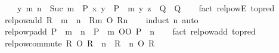 \begin{isabellebody}
\ \ \ \ {\isacharparenleft}{\kern0pt}{\isasymAnd}y\ m{\isachardot}{\kern0pt}\ n\ {\isacharequal}{\kern0pt}\ Suc\ m\ {\isasymLongrightarrow}\ P\ x\ y\ {\isasymLongrightarrow}\ {\isacharparenleft}{\kern0pt}P\ {\isacharcircum}{\kern0pt}{\isacharcircum}{\kern0pt}\ m{\isacharparenright}{\kern0pt}\ y\ z\ {\isasymLongrightarrow}\ Q{\isacharparenright}{\kern0pt}\ {\isasymLongrightarrow}\ Q{\isachardoublequoteclose}\isanewline
%
\isadelimproof
\ \ %
\endisadelimproof
%
\isatagproof
{}\isamarkupfalse%
\ {\isacharparenleft}{\kern0pt}fact\ relpow{\isacharunderscore}{\kern0pt}E{}\ {\isacharbrackleft}{\kern0pt}to{\isacharunderscore}{\kern0pt}pred{\isacharbrackright}{\kern0pt}{\isacharparenright}{\kern0pt}%
\endisatagproof
{\isafoldproof}%
%
\isadelimproof
\isanewline
%
\endisadelimproof
\isanewline
{}\isamarkupfalse%
\ relpow{\isacharunderscore}{\kern0pt}add{\isacharcolon}{\kern0pt}\ {\isachardoublequoteopen}R\ {\isacharcircum}{\kern0pt}{\isacharcircum}{\kern0pt}\ {\isacharparenleft}{\kern0pt}m\ {\isacharplus}{\kern0pt}\ n{\isacharparenright}{\kern0pt}\ {\isacharequal}{\kern0pt}\ R{\isacharcircum}{\kern0pt}{\isacharcircum}{\kern0pt}m\ O\ R{\isacharcircum}{\kern0pt}{\isacharcircum}{\kern0pt}n{\isachardoublequoteclose}\isanewline
%
\isadelimproof
\ \ %
\endisadelimproof
%
\isatagproof
{}\isamarkupfalse%
\ {\isacharparenleft}{\kern0pt}induct\ n{\isacharparenright}{\kern0pt}\ auto%
\endisatagproof
{\isafoldproof}%
%
\isadelimproof
\isanewline
%
\endisadelimproof
\isanewline
{}\isamarkupfalse%
\ relpowp{\isacharunderscore}{\kern0pt}add{\isacharcolon}{\kern0pt}\ {\isachardoublequoteopen}P\ {\isacharcircum}{\kern0pt}{\isacharcircum}{\kern0pt}\ {\isacharparenleft}{\kern0pt}m\ {\isacharplus}{\kern0pt}\ n{\isacharparenright}{\kern0pt}\ {\isacharequal}{\kern0pt}\ P\ {\isacharcircum}{\kern0pt}{\isacharcircum}{\kern0pt}\ m\ OO\ P\ {\isacharcircum}{\kern0pt}{\isacharcircum}{\kern0pt}\ n{\isachardoublequoteclose}\isanewline
%
\isadelimproof
\ \ %
\endisadelimproof
%
\isatagproof
{}\isamarkupfalse%
\ {\isacharparenleft}{\kern0pt}fact\ relpow{\isacharunderscore}{\kern0pt}add\ {\isacharbrackleft}{\kern0pt}to{\isacharunderscore}{\kern0pt}pred{\isacharbrackright}{\kern0pt}{\isacharparenright}{\kern0pt}%
\endisatagproof
{\isafoldproof}%
%
\isadelimproof
\isanewline
%
\endisadelimproof
\isanewline
{}\isamarkupfalse%
\ relpow{\isacharunderscore}{\kern0pt}commute{\isacharcolon}{\kern0pt}\ {\isachardoublequoteopen}R\ O\ R\ {\isacharcircum}{\kern0pt}{\isacharcircum}{\kern0pt}\ n\ {\isacharequal}{\kern0pt}\ R\ {\isacharcircum}{\kern0pt}{\isacharcircum}{\kern0pt}\ n\ O\ R{\isachardoublequoteclose}\isanewline

\end{isabellebody}
